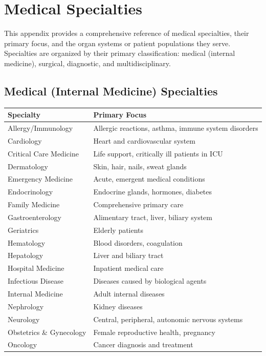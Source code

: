 \chapter{Medical Specialties}

\noindent This appendix provides a comprehensive reference of medical specialties, their primary focus, and the organ systems or patient populations they serve. Specialties are organized by their primary classification: medical (internal medicine), surgical, diagnostic, and multidisciplinary.

\section*{Medical (Internal Medicine) Specialties}

\begin{tabularx}{\textwidth}{@{}lX@{}}
\toprule
\textbf{Specialty} & \textbf{Primary Focus} \\
\midrule
Allergy/Immunology & Allergic reactions, asthma, immune system disorders \\
Cardiology & Heart and cardiovascular system \\
Critical Care Medicine & Life support, critically ill patients in ICU \\
Dermatology & Skin, hair, nails, sweat glands \\
Emergency Medicine & Acute, emergent medical conditions \\
Endocrinology & Endocrine glands, hormones, diabetes \\
Family Medicine & Comprehensive primary care \\
Gastroenterology & Alimentary tract, liver, biliary system \\
Geriatrics & Elderly patients \\
Hematology & Blood disorders, coagulation \\
Hepatology & Liver and biliary tract \\
Hospital Medicine & Inpatient medical care \\
Infectious Disease & Diseases caused by biological agents \\
Internal Medicine & Adult internal diseases \\
Nephrology & Kidney diseases \\
Neurology & Central, peripheral, autonomic nervous systems \\
Obstetrics \& Gynecology & Female reproductive health, pregnancy \\
Oncology & Cancer diagnosis and treatment \\

\end{tabularx}
